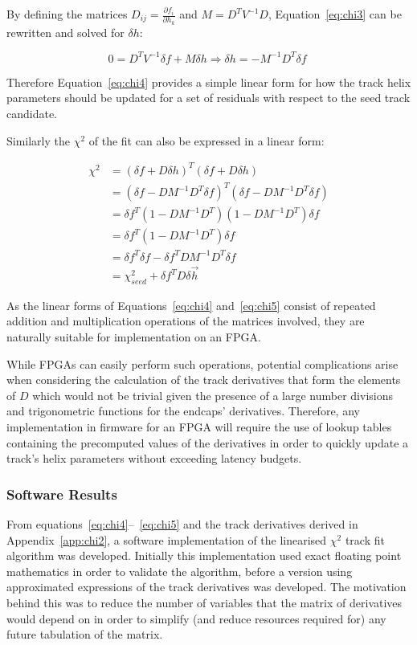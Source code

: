 By defining the matrices $D_{ij} = \frac{\partial f_{i}}{\partial h_{k}}$ and $M = D^{T} V^{-1} D$, Equation~\ref{eq:chi3} can be rewritten and solved for $\delta h$:

\begin{equation}
0 = D^{T} V^{-1} \delta f + M \delta h \Rightarrow \delta h = - M^{-1} D^{T} \delta f \;
\label{eq:chi4}
\end{equation}

Therefore Equation~\ref{eq:chi4} provides a simple linear form for how the track helix parameters should be updated for a set of residuals with respect to the seed track candidate.

Similarly the $\chi^{2}$ of the fit can also be expressed in a linear form:

\begin{equation}
\begin{split}
\chi^{2} &= (\delta f + D \delta h)^{T}(\delta f + D \delta h) \\
         &= (\delta f - DM^{-1}D^{T}\delta f)^{T} (\delta f - DM^{-1}D^{T}\delta f) \\
         &= \delta f^{T} (1- DM^{-1}D^{T}) (1- DM^{-1}D^{T}) \delta f \\
         &= \delta f^{T} (1- DM^{-1}D^{T}) \delta f \\
         &= \delta f^{T} \delta f - \delta f^{T} DM^{-1}D^{T} \delta f \\
         &= \chi^{2}_{seed} + \delta f^{T} D \delta \overrightarrow{h} 
\end{split}
\label{eq:chi5}
\end{equation}

As the linear forms of Equations~\ref{eq:chi4} and~\ref{eq:chi5} consist of repeated addition and multiplication operations of the matrices involved, they are naturally suitable for implementation on an FPGA.

While FPGAs can easily perform such operations, potential complications arise when considering the calculation of the track derivatives that form the elements of $D$ which would not be trivial given the presence of a large number divisions and trigonometric functions for the endcaps' derivatives.
Therefore, any implementation in firmware for an FPGA will require the use of lookup tables containing the precomputed values of the derivatives in order to quickly update a track's helix parameters without exceeding latency budgets.

\subsubsection{Software Results}\label{subsubsec:chi2software}
From equations~\ref{eq:chi4}--~\ref{eq:chi5} and the track derivatives derived in Appendix~\ref{app:chi2}, a software implementation of the linearised $\chi^{2}$ track fit algorithm was developed.
Initially this implementation used exact floating point mathematics in order to validate the algorithm, before a version using approximated expressions of the track derivatives was developed.
The motivation behind this was to reduce the number of variables that the matrix of derivatives would depend on in order to simplify (and reduce resources required for) any future tabulation of the matrix.


